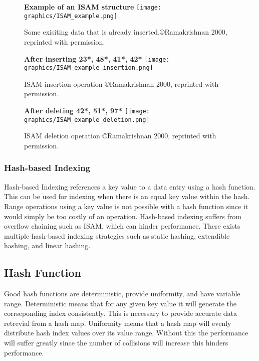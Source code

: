 \documentclass[letterpaper, 12pt]{article}
\begin{document}
\begin{figure}
  \centering
  \textbf{Example of an ISAM structure}
  \texttt{[image: graphics/ISAM\_example.png]}
  
  \caption{Some exisiting data that is already inserted.\copyright Ramakrishnan 2000, reprinted with permission.\cite{ramakrishnan2000database}}
  \label{fig:isam_example_vis}
\end{figure}

\begin{figure}
  \centering
  \textbf{After inserting 23*, 48*, 41*, 42*}
  \texttt{[image: graphics/ISAM\_example\_insertion.png]}
  \caption{ISAM insertion operation \copyright Ramakrishnan 2000, reprinted \newline with permission.\cite{ramakrishnan2000database}}
  \label{fig:isam_example_insert}
\end{figure}

\begin{figure}
  \centering
  \textbf{After deleting 42*, 51*, 97*}
  \texttt{[image: graphics/ISAM\_example\_deletion.png]}
  \caption{ISAM deletion operation \copyright Ramakrishnan 2000, reprinted \newline with permission.\cite{ramakrishnan2000database}}
  \label{fig:isam_example_delete}
\end{figure}

\subsubsection{Hash-based Indexing}
Hash-based Indexing references a key value to a data entry using a hash function. This can be
used for indexing when there is an equal key value within the hash. Range operations using
a key value is not possible with a hash function since it would simply be too costly of an
operation. Hash-based indexing suffers from overflow chaining such as ISAM, which can hinder
performance. There exists multiple hash-based indexing strategies such as static hashing, extendible hashing,
and linear hashing.
\subsection{Hash Function}
Good hash functions are deterministic, provide uniformity, and have variable range. Deterministic means
that for any given key value it will generate the corrseponding index consistently. This is
necessary to provide accurate data retrevial from a hash map. Uniformity means that a hash
map will evenly distribute hash index values over its value range. Without this the
performance will suffer greatly since the number of collisions will increase this hinders performance.
\end{document}
